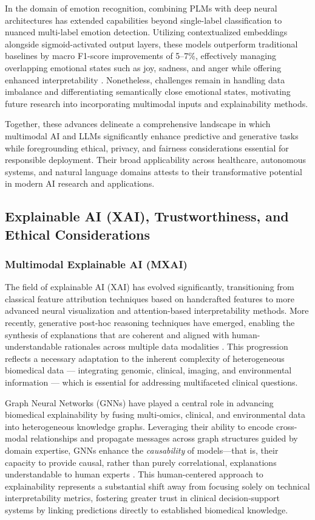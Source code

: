 In the domain of emotion recognition, combining PLMs with deep neural architectures has extended capabilities beyond single-label classification to nuanced multi-label emotion detection. Utilizing contextualized embeddings alongside sigmoid-activated output layers, these models outperform traditional baselines by macro F1-score improvements of 5–7\%, effectively managing overlapping emotional states such as joy, sadness, and anger while offering enhanced interpretability \cite{ref36}. Nonetheless, challenges remain in handling data imbalance and differentiating semantically close emotional states, motivating future research into incorporating multimodal inputs and explainability methods.

Together, these advances delineate a comprehensive landscape in which multimodal AI and LLMs significantly enhance predictive and generative tasks while foregrounding ethical, privacy, and fairness considerations essential for responsible deployment. Their broad applicability across healthcare, autonomous systems, and natural language domains attests to their transformative potential in modern AI research and applications.

\subsection{Explainable AI (XAI), Trustworthiness, and Ethical Considerations}

\subsubsection{Multimodal Explainable AI (MXAI)}

The field of explainable AI (XAI) has evolved significantly, transitioning from classical feature attribution techniques based on handcrafted features to more advanced neural visualization and attention-based interpretability methods. More recently, generative post-hoc reasoning techniques have emerged, enabling the synthesis of explanations that are coherent and aligned with human-understandable rationales across multiple data modalities \cite{ref13,ref24,ref25}. This progression reflects a necessary adaptation to the inherent complexity of heterogeneous biomedical data — integrating genomic, clinical, imaging, and environmental information — which is essential for addressing multifaceted clinical questions.

Graph Neural Networks (GNNs) have played a central role in advancing biomedical explainability by fusing multi-omics, clinical, and environmental data into heterogeneous knowledge graphs. Leveraging their ability to encode cross-modal relationships and propagate messages across graph structures guided by domain expertise, GNNs enhance the \textit{causability} of models—that is, their capacity to provide causal, rather than purely correlational, explanations understandable to human experts \cite{ref24}. This human-centered approach to explainability represents a substantial shift away from focusing solely on technical interpretability metrics, fostering greater trust in clinical decision-support systems by linking predictions directly to established biomedical knowledge.

